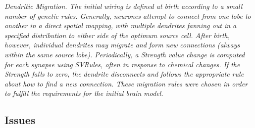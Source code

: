 \documentclass[11pt,twoside,a4paper]{article}
\begin{document}
\clearpage

\emph{Dendritic Migration. The initial wiring is defined at birth according to a small number of genetic rules. Generally, neurones attempt to connect from one lobe to another in a direct spatial mapping, with multiple dendrites fanning out in a specified distribution to either side of the optimum source cell. After birth, however, individual dendrites may migrate and form new connections (always within the same source lobe). Periodically, a Strength value change is computed for each synapse using SVRules, often in response to chemical changes. If the Strength falls to zero, the dendrite disconnects and follows the appropriate rule about how to find a new connection. These migration rules were chosen in order to fulfill the requirements for the initial brain model.}

\subsection{Issues}
\end{document}
